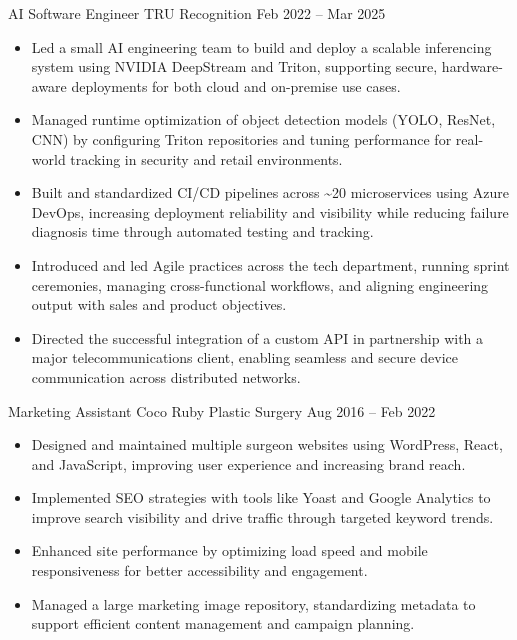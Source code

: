 \documentclass[9pt]{extarticle}
\begin{document}
\cvbreak

\begin{minipage}[t]{\textwidth}
	\vspace{-\baselineskip}

	\cvexperience
		{AI Software Engineer}
		{TRU Recognition}
		{Feb 2022 -- Mar 2025}
		{
			\begin{itemize}[itemsep=0.25em]
				\item Led a small AI engineering team to build and deploy a scalable inferencing system using NVIDIA DeepStream and Triton, supporting secure, hardware-aware deployments for both cloud and on-premise use cases.
				\item Managed runtime optimization of object detection models (YOLO, ResNet, CNN) by configuring Triton repositories and tuning performance for real-world tracking in security and retail environments.
				\item Built and standardized CI/CD pipelines across \textasciitilde20 microservices using Azure DevOps, increasing deployment reliability and visibility while reducing failure diagnosis time through automated testing and tracking.
				\item Introduced and led Agile practices across the tech department, running sprint ceremonies, managing cross-functional workflows, and aligning engineering output with sales and product objectives.
				\item Directed the successful integration of a custom API in partnership with a major telecommunications client, enabling seamless and secure device communication across distributed networks.
			\end{itemize}
		}

	\cvexperience
		{Marketing Assistant}
		{Coco Ruby Plastic Surgery}
		{Aug 2016 -- Feb 2022}
		{
			\begin{itemize}[itemsep=0.25em]
    			\item Designed and maintained multiple surgeon websites using WordPress, React, and JavaScript, improving user experience and increasing brand reach.
				\item Implemented SEO strategies with tools like Yoast and Google Analytics to improve search visibility and drive traffic through targeted keyword trends.
				\item Enhanced site performance by optimizing load speed and mobile responsiveness for better accessibility and engagement.
    			\item Managed a large marketing image repository, standardizing metadata to support efficient content management and campaign planning.
			\end{itemize}
		}


\end{minipage}
\end{document}
